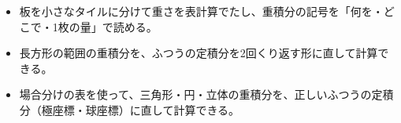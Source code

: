 \newcommand\kviiigframe[2][100mm]{\par\addvspace{4pt}{\centering\tikz\node[draw=\bkTT, line width=0.9pt, fill=bkTheme!6, rounded corners=1.5mm, inner xsep=6mm, inner ysep=2.5mm, align=center]{#2};\par}\addvspace{4pt}\noindent\ignorespaces}
\newcommand\kviiiga{\par\vspace{2pt}\noindent\rightskip=0pt plus 8em\relax\hangindent=2.6\zw\hangafter=0\relax}
\newcommand\kviiigb{\par\vspace{2pt}\noindent\rightskip=0pt plus 8em\relax\hangindent=4.3\zw\hangafter=0\relax}
\newcommand\kviiigs{\rightskip=0pt plus 8em\relax}
\newcommand\kviiigplate[4]{\begin{scope}[shift={#1}]
  \pgfmathsetmacro\kviiigdx{2*#2/#3}\pgfmathsetmacro\kviiigdy{#2/#4}
  \foreach \kviiigi in {1,...,#3} {\foreach \kviiigj in {1,...,#4} {%
    \pgfmathsetmacro\kviiigs{10+5*(\kviiigi-0.5)*2/#3+2*(\kviiigj-0.5)/#4}%
    \pgfmathtruncatemacro\kviiigc{8+3.1*(\kviiigs-10)}%
    \fill[bkTheme!\kviiigc] ({(\kviiigi-1)*\kviiigdx},{(\kviiigj-1)*\kviiigdy}) rectangle ++(\kviiigdx,\kviiigdy);}}
  \draw[bkTheme!60!black, line width=0.4pt, xstep=\kviiigdx, ystep=\kviiigdy] (0,0) grid ({2*#2},#2);
  \draw[bkInk, line width=0.9pt] (0,0) rectangle ({2*#2},#2);
\end{scope}}
\makeatother


\begin{goal}
\begin{itemize}[label={\color{\bkTT}●}, leftmargin=1.6\zw, itemsep=0pt, topsep=1pt]
\item {}\enspace 板を小さなタイルに分けて重さを表計算でたし、重積分の記号を「何を・どこで・1枚の量」で読める。
\item {}\enspace 長方形の範囲の重積分を、ふつうの定積分を2回くり返す形に直して計算できる。
\item {}\enspace 場合分けの表を使って、三角形・円・立体の重積分を、正しいふつうの定積分（極座標・球座標）に直して計算できる。
\end{itemize}
\end{goal}

